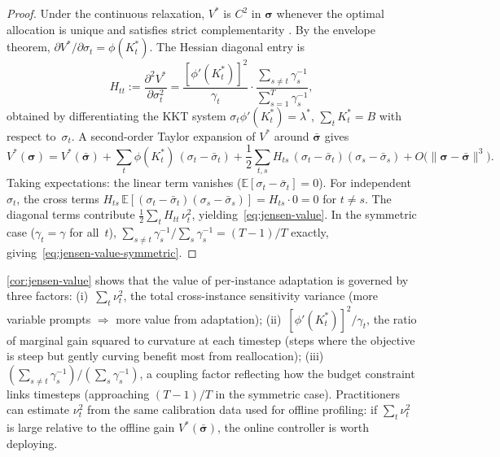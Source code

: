 \begin{proof}
Under the continuous relaxation, $V^*$ is $C^2$ in
$\boldsymbol{\sigma}$ whenever the optimal allocation is unique
and satisfies strict complementarity
\citep[Thm.~4.24]{bonnans2000perturbation}.
By the envelope theorem, $\partial V^*/\partial\sigma_t=\phi(K_t^*)$.
The Hessian diagonal entry is
\[
  H_{tt}
  :=
  \frac{\partial^2 V^*}{\partial\sigma_t^2}
  =
  \frac{[\phi'(K_t^*)]^2}{\gamma_t}
  \cdot
  \frac{\sum_{s\ne t}\gamma_s^{-1}}
       {\sum_{s=1}^T \gamma_s^{-1}},
\]
obtained by differentiating the KKT system
$\sigma_t\phi'(K_t^*)=\lambda^*$, $\sum_t K_t^*=B$ with respect
to~$\sigma_t$.
A second-order Taylor expansion of $V^*$ around
$\bar{\boldsymbol{\sigma}}$ gives
\[
  V^*(\boldsymbol{\sigma})
  =
  V^*(\bar{\boldsymbol{\sigma}})
  + \sum_t \phi(K_t^*)\,(\sigma_t-\bar\sigma_t)
  + \frac{1}{2}\sum_{t,s} H_{ts}\,
    (\sigma_t-\bar\sigma_t)(\sigma_s-\bar\sigma_s)
  + O\!\bigl(\|\boldsymbol{\sigma}-\bar{\boldsymbol{\sigma}}\|^3
  \bigr).
\]
Taking expectations: the linear term vanishes
($\mathbb{E}[\sigma_t-\bar\sigma_t]=0$).
For independent $\sigma_t$, the cross terms
$H_{ts}\,\mathbb{E}[(\sigma_t-\bar\sigma_t)(\sigma_s-\bar\sigma_s)]
= H_{ts}\cdot 0 = 0$ for $t\ne s$.
The diagonal terms contribute
$\frac{1}{2}\sum_t H_{tt}\,\nu_t^2$,
yielding~\eqref{eq:jensen-value}.
In the symmetric case ($\gamma_t=\gamma$ for all~$t$),
$\sum_{s\ne t}\gamma_s^{-1}/\sum_s\gamma_s^{-1}=(T{-}1)/T$
exactly, giving~\eqref{eq:jensen-value-symmetric}.
\end{proof}

\begin{remark}
\label{rmk:jensen-value}
\cref{cor:jensen-value} shows that the value of per-instance
adaptation is governed by three factors:
(i)~$\sum_t\nu_t^2$, the total cross-instance sensitivity variance
(more variable prompts $\Rightarrow$ more value from adaptation);
(ii)~$[\phi'(K_t^*)]^2/\gamma_t$, the ratio of marginal gain
squared to curvature at each timestep (steps where the objective is
steep but gently curving benefit most from reallocation);
(iii)~$(\sum_{s\ne t}\gamma_s^{-1})/(\sum_s\gamma_s^{-1})$,
a coupling factor reflecting how the budget constraint links
timesteps (approaching $(T{-}1)/T$ in the symmetric case).
Practitioners can estimate $\nu_t^2$ from the same calibration
data used for offline profiling:
if $\sum_t\nu_t^2$ is large relative to the offline gain
$V^*(\bar{\boldsymbol{\sigma}})$, the online controller is
worth deploying.
\end{remark}

